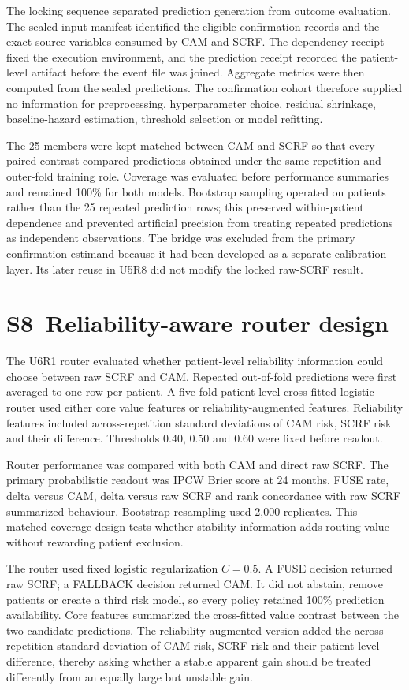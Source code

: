 \documentclass[pdflatex,sn-nature]{sn-jnl}
\begin{document}
The locking sequence separated prediction generation from outcome evaluation. The sealed input manifest identified the eligible confirmation records and the exact source variables consumed by CAM and SCRF. The dependency receipt fixed the execution environment, and the prediction receipt recorded the patient-level artifact before the event file was joined. Aggregate metrics were then computed from the sealed predictions. The confirmation cohort therefore supplied no information for preprocessing, hyperparameter choice, residual shrinkage, baseline-hazard estimation, threshold selection or model refitting.

The 25 members were kept matched between CAM and SCRF so that every paired contrast compared predictions obtained under the same repetition and outer-fold training role. Coverage was evaluated before performance summaries and remained 100\% for both models. Bootstrap sampling operated on patients rather than the 25 repeated prediction rows; this preserved within-patient dependence and prevented artificial precision from treating repeated predictions as independent observations. The bridge was excluded from the primary confirmation estimand because it had been developed as a separate calibration layer. Its later reuse in U5R8 did not modify the locked raw-SCRF result.

\section*{S8~Reliability-aware router design}
The U6R1 router evaluated whether patient-level reliability information could choose between raw SCRF and CAM. Repeated out-of-fold predictions were first averaged to one row per patient. A five-fold patient-level cross-fitted logistic router used either core value features or reliability-augmented features. Reliability features included across-repetition standard deviations of CAM risk, SCRF risk and their difference. Thresholds 0.40, 0.50 and 0.60 were fixed before readout.

Router performance was compared with both CAM and direct raw SCRF. The primary probabilistic readout was IPCW Brier score at 24 months. FUSE rate, delta versus CAM, delta versus raw SCRF and rank concordance with raw SCRF summarized behaviour. Bootstrap resampling used 2,000 replicates. This matched-coverage design tests whether stability information adds routing value without rewarding patient exclusion.

The router used fixed logistic regularization $C=0.5$. A FUSE decision returned raw SCRF; a FALLBACK decision returned CAM. It did not abstain, remove patients or create a third risk model, so every policy retained 100\% prediction availability. Core features summarized the cross-fitted value contrast between the two candidate predictions. The reliability-augmented version added the across-repetition standard deviation of CAM risk, SCRF risk and their patient-level difference, thereby asking whether a stable apparent gain should be treated differently from an equally large but unstable gain.
\end{document}

